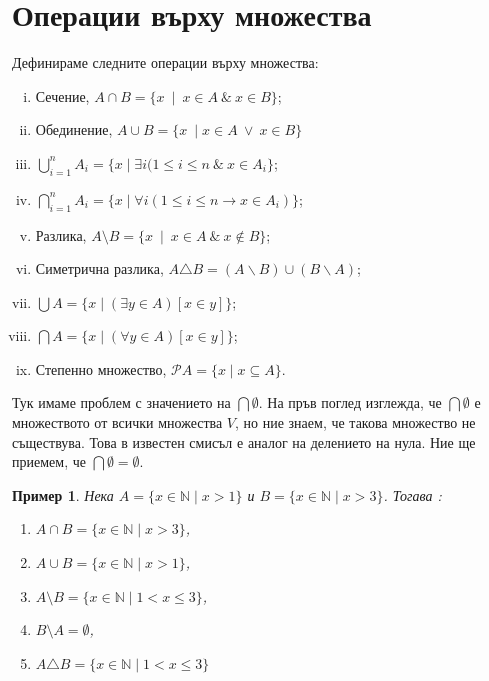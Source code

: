 \documentclass[a4paper]{article}
\newtheorem{example}{Пример}
\newcommand{\N}{\mathbb{N}}
\newcommand{\Ps}{\mathscr{P}}
\begin{document}
\author{Stefan Vatev}

\section{Операции върху множества}

Дефинираме следните операции върху множества:
\begin{enumerate}[(i)]
  \item
    Сечение, $A\cap B = \{x\ \mid\ x\in A\ \&\ x\in B\}$;
  \item
    Обединение, $A\cup B = \{x\ \mid x\in A\ \vee\ x\in B\}$
  \item
    $\bigcup^{n}_{i=1} A_i = \{x \mid \exists i (1\leq i\leq n\ \&\ x\in A_i \}$;
  \item
    $\bigcap^{n}_{i=1} A_i = \{x \mid \forall i (1\leq i\leq n \rightarrow x\in A_i)\}$;
  \item
    Разлика, $A\setminus B = \{x\ \mid\ x\in A\ \&\ x\not\in B\}$;
  \item
    Симетрична разлика, $A\triangle B = (A\backslash B)\cup (B\backslash A)$;
  \item
    $\bigcup A = \{x\mid (\exists y\in A)[x\in y]\}$;
  \item
    $\bigcap A = \{x\mid (\forall y\in A)[x\in y]\}$;
  \item
    Степенно множество, $\Ps A = \{x\mid x\subseteq A\}$.
\end{enumerate}

Тук имаме проблем с значението на $\bigcap\emptyset$.
На пръв поглед изглежда, че $\bigcap\emptyset$ е множеството от всички множества $V$, 
но ние знаем, че такова множество не съществува.
Това в известен смисъл е аналог на делението на нула.
Ние ще приемем, че $\bigcap\emptyset = \emptyset$.


\begin{example}
  Нека $A = \{x\in\N\mid x > 1\}$ и $B = \{x\in\N\mid x>3\}$. Тогава :
    \begin{enumerate}[]
    \item
      $A\cap B = \{x\in\N\mid x > 3\}$,
    \item
      $A\cup B = \{x\in\N\mid x > 1\}$,
    \item
      $A\setminus B = \{x\in\N\mid 1<x\leq 3\}$,
    \item
      $B\setminus A = \emptyset$,
    \item
      $A\triangle B = \{x\in\N\mid 1<x\leq 3\}$
    \end{enumerate}
\end{example}
\end{document}
